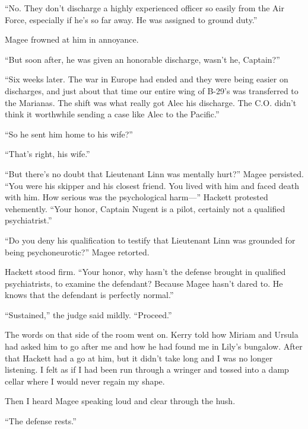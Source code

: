 \documentclass{novel}
\begin{document}
“No. They don’t discharge a highly experienced officer so easily from the Air Force, especially if he’s so far away. He was assigned to ground duty.”

Magee frowned at him in annoyance.

“But soon after, he was given an honorable discharge, wasn’t he, Captain?”

“Six weeks later. The war in Europe had ended and they were being easier on discharges, and just about that time our entire wing of B-29’s was transferred to the Marianas. The shift was what really got Alec his discharge. The C.O. didn’t think it worthwhile sending a case like Alec to the Pacific.”

“So he sent him home to his wife?”

“That’s right, his wife.”

“But there’s no doubt that Lieutenant Linn was mentally hurt?” Magee persisted. “You were his skipper and his closest friend. You lived with him and faced death with him. How serious was the psychological harm—” Hackett protested vehemently. “Your honor, Captain Nugent is a pilot, certainly not a qualified psychiatrist.”

“Do you deny his qualification to testify that Lieutenant Linn was grounded for being psychoneurotic?” Magee retorted.

Hackett stood firm. “Your honor, why hasn’t the defense brought in qualified psychiatrists, to examine the defendant? Because Magee hasn’t dared to. He knows that the defendant is perfectly normal.”

“Sustained,” the judge said mildly. “Proceed.”

The words on that side of the room went on. Kerry told how Miriam and Ursula had asked him to go after me and how he had found me in Lily’s bungalow. After that Hackett had a go at him, but it didn’t take long and I was no longer listening. I felt as if I had been run through a wringer and tossed into a damp cellar where I would never regain my shape.

Then I heard Magee speaking loud and clear through the hush.

“The defense rests.”

\vspace{2\nbs}
\clearpage
\thispagestyle{empty}
\begin{ChapterStart}
\vspace{3\nbs}
\end{ChapterStart}
\end{document}
